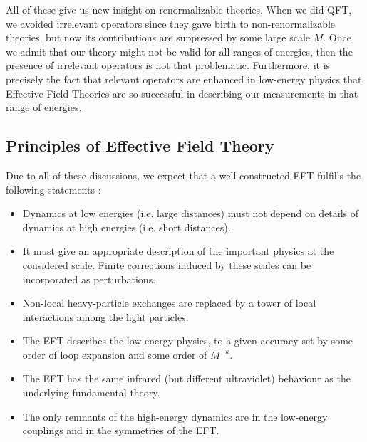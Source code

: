 \documentclass[11pt]{article}
\begin{document}
All of these give us new insight on renormalizable theories. When we did QFT, we avoided irrelevant operators since they gave birth to non-renormalizable theories, but now its contributions are suppressed by some large scale $M$. Once we admit that our theory might not be valid for all ranges of energies, then the presence of irrelevant operators is not that problematic. Furthermore, it is precisely the fact that relevant operators are enhanced in low-energy physics that Effective Field Theories are so successful in describing our measurements in that range of energies.

\subsection{Principles of Effective Field Theory}

Due to all of these discussions, we expect that a well-constructed EFT fulfills the following statements \cite{pich1998effectivefieldtheory}:
\begin{itemize}
    \item Dynamics at low energies (i.e. large distances) must not depend on details of dynamics at high energies (i.e. short distances).

    \item It must give an appropriate description of the important physics at the considered scale. Finite corrections induced by these scales can be incorporated as perturbations.

    \item Non-local heavy-particle exchanges are replaced by a tower of local interactions among the light particles.

    \item The EFT describes the low-energy physics, to a given accuracy set by some order of loop expansion and some order of $M^{-k}$.
    \item The EFT has the same infrared (but different ultraviolet) behaviour as the underlying fundamental theory.

    \item The only remnants of the high-energy dynamics are in the low-energy couplings and in the symmetries of the EFT.
\end{itemize}
\end{document}
